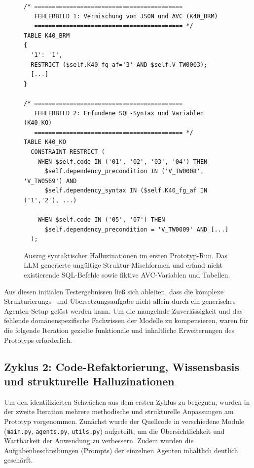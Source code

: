 \begin{figure}[htbp]
    \centering
\begin{lstlisting}
/* ==========================================
   FEHLERBILD 1: Vermischung von JSON und AVC (K40_BRM)
   ========================================== */
TABLE K40_BRM
{
  '1': '1',
  RESTRICT ($self.K40_fg_af='3' AND $self.V_TW0003);
  [...]
}

/* ==========================================
   FEHLERBILD 2: Erfundene SQL-Syntax und Variablen (K40_KO)
   ========================================== */
TABLE K40_KO
  CONSTRAINT RESTRICT (
    WHEN $self.code IN ('01', '02', '03', '04') THEN
      $self.dependency_precondition IN ('V_TW0008', 'V_TW0569') AND
      $self.dependency_syntax IN ($self.K40_fg_af IN ('1','2'), ...)
    
    WHEN $self.code IN ('05', '07') THEN
      $self.dependency_precondition = 'V_TW0009' AND [...]
  );
\end{lstlisting}
    \caption{Auszug syntaktischer Halluzinationen im ersten Prototyp-Run. Das \ac{LLM} generierte ungültige Struktur-Mischformen und erfand nicht existierende SQL-Befehle sowie fiktive \ac{AVC}-Variablen und Tabellen.}
    \label{fig:syntax_halluzinationen_run1}
\end{figure}

Aus diesen initialen Testergebnissen ließ sich ableiten, dass die komplexe Strukturierungs- und Übersetzungsaufgabe nicht allein durch ein generisches Agenten-Setup gelöst werden kann. Um die mangelnde Zuverlässigkeit und das fehlende domänenspezifische Fachwissen der Modelle zu kompensieren, waren für die folgende Iteration gezielte funktionale und inhaltliche Erweiterungen des Prototyps erforderlich.

\subsection{Zyklus 2: Code-Refaktorierung, Wissensbasis und strukturelle Halluzinationen}
\label{subsec:zyklus_2_refaktorierung_halluzinationen}

Um den identifizierten Schwächen aus dem ersten Zyklus zu begegnen, wurden in der zweite Iteration mehrere methodische und strukturelle Anpassungen am Prototyp vorgenommen. Zunächst wurde der Quellcode in verschiedene Module (\texttt{main.py}, \texttt{agents.py}, \texttt{utils.py}) aufgeteilt, um die Übersichtlichkeit und Wartbarkeit der Anwendung zu verbessern. Zudem wurden die Aufgabenbeschreibungen (Prompts) der einzelnen Agenten inhaltlich deutlich geschärft. 

